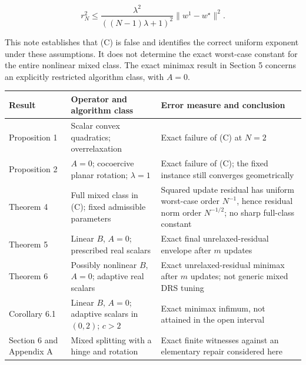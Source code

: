 \documentclass[
  british,
  11pt,
  a4paper,
]{article}
\newcounter{none} %
\begin{document}
\[
r_N^2\leq
\frac{\lambda^2}{((N-1)\lambda+1)^2}
\|w^1-w^\star\|^2.
\tag{C}
\]

This note establishes that (C) is false and identifies the correct
uniform exponent under these assumptions. It does not determine the
exact worst-case constant for the entire nonlinear mixed class. The
exact minimax result in Section 5 concerns an explicitly restricted
algorithm class, with \(A=0\).

{\def\LTcaptype{none} %
\begin{longtable}[]{@{}
  >{\raggedright\arraybackslash}p{}
  >{\raggedright\arraybackslash}p{}
  >{\raggedright\arraybackslash}p{}@{}}
\toprule\noalign{}
\begin{minipage}[b]{\linewidth}\raggedright
Result
\end{minipage} & \begin{minipage}[b]{\linewidth}\raggedright
Operator and algorithm class
\end{minipage} & \begin{minipage}[b]{\linewidth}\raggedright
Error measure and conclusion
\end{minipage} \\
\midrule\noalign{}
\endhead
\bottomrule\noalign{}
\endlastfoot
Proposition 1 & Scalar convex quadratics; overrelaxation & Exact failure
of (C) at \(N=2\) \\
Proposition 2 & \(A=0\); cocoercive planar rotation; \(\lambda=1\) &
Exact failure of (C); the fixed instance still converges
geometrically \\
Theorem 4 & Full mixed class in (C); fixed admissible parameters &
Squared update residual has uniform worst-case order \(N^{-1}\), hence
residual norm order \(N^{-1/2}\); no sharp full-class constant \\
Theorem 5 & Linear \(B\), \(A=0\); prescribed real scalars & Exact final
unrelaxed-residual envelope after \(m\) updates \\
Theorem 6 & Possibly nonlinear \(B\), \(A=0\); adaptive real scalars &
Exact unrelaxed-residual minimax after \(m\) updates; not generic mixed
DRS tuning \\
Corollary 6.1 & Linear \(B\), \(A=0\); adaptive scalars in \((0,2)\);
\(c>2\) & Exact minimax infimum, not attained in the open interval \\
Section 6 and Appendix A & Mixed splitting with a hinge and rotation &
Exact finite witnesses against an elementary repair considered here \\
\end{longtable}
}
\end{document}
